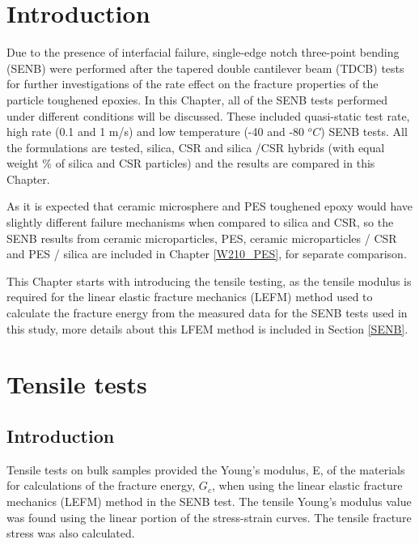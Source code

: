 \documentclass[numbers=noendperiod,chapterprefix=on]{icldt} %
\begin{document}
\section{Introduction}
Due to the presence of interfacial failure, single-edge notch three-point bending (SENB) were performed after the tapered double cantilever beam (TDCB) tests for further investigations of the rate effect on the fracture properties of the particle toughened epoxies.  
In this Chapter, all of the SENB tests performed under different conditions will be discussed. These included quasi-static test rate, high rate (0.1 and 1 m/s) and low temperature (-40 and -80 $^oC$) SENB tests. All the formulations are tested, silica, CSR and silica /CSR hybrids (with equal weight \% of silica and CSR particles) and the results are compared in this Chapter. 

As it is expected that ceramic microsphere and PES toughened epoxy would have slightly different failure mechanisms when compared to silica and CSR, so the SENB results from ceramic microparticles, PES, ceramic microparticles / CSR and PES / silica are included in Chapter \ref{W210_PES}, for separate comparison.
 
This Chapter starts with introducing the tensile testing, as the tensile modulus is required for the linear elastic fracture mechanics (LEFM) method used to calculate the fracture energy from the measured data for the SENB tests used in this study, more details about this LFEM method is included in Section \ref{SENB}.

\section{Tensile tests}

\subsection{Introduction}
Tensile tests on bulk samples provided the Young's modulus, E, of the materials for calculations of the fracture energy, $G_c$, when using the linear elastic fracture mechanics (LEFM) method in the SENB test. The tensile Young's modulus value was found using the linear portion of the stress-strain curves. The tensile fracture stress was also calculated. 


%
%
\end{document}
